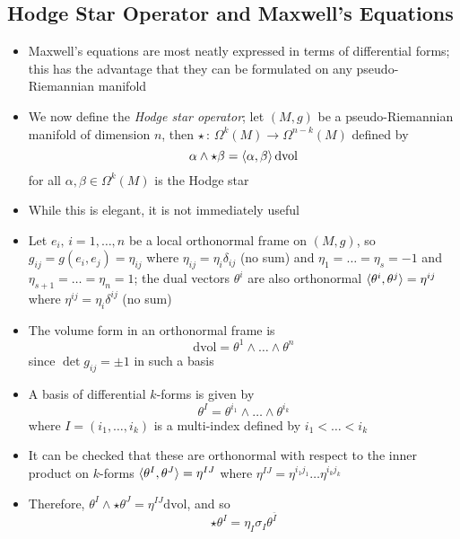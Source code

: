 \documentclass[12pt,a4paper]{article}
\numberwithin{equation}{section}
\begin{document}
	\subsection{Hodge Star Operator and Maxwell's Equations}
	\begin{itemize}
		\item Maxwell's equations are most neatly expressed in terms of differential forms; this has the advantage that they can be formulated on any pseudo-Riemannian manifold
		\item We now define the \textit{Hodge star operator}; let $(M,g)$ be a pseudo-Riemannian manifold of dimension $n$, then $\star\,:\,\Omega^{k}(M)\to\Omega^{n-k}(M)$ defined by
		\begin{equation}
			\alpha\wedge\star\beta=\braket{\alpha,\beta}\text{dvol}
		\end{equation}
		for all $\alpha,\beta\in\Omega^{k}(M)$ is the Hodge star
		\item While this is elegant, it is not immediately useful
		\item Let $e_{i},\,i=1,\ldots,n$ be a local orthonormal frame on $(M,g)$, so $g_{ij}=g(e_{i},e_{j})=\eta_{ij}$ where $\eta_{ij}=\eta_{i}\delta_{ij}$ (no sum) and $\eta_{1}=\ldots=\eta_{s}=-1$ and $\eta_{s+1}=\ldots=\eta_{n}=1$; the dual vectors $\theta^{i}$ are also orthonormal $\braket{\theta^{i},\theta^{j}}=\eta^{ij}$ where $\eta^{ij}=\eta_{i}\delta^{ij}$ (no sum)
		\item The volume form in an orthonormal frame is
		\begin{equation}
			\text{dvol}=\theta^{1}\wedge\ldots\wedge\theta^{n}
		\end{equation}
		since $\det{g_{ij}}=\pm1$ in such a basis
		\item A basis of differential $k$-forms is given by
		\begin{equation}
			\theta^{I}=\theta^{i_{1}}\wedge\ldots\wedge\theta^{i_{k}}
		\end{equation}
		where $I=(i_{1},\ldots,i_{k})$ is a multi-index defined by $i_{1}<\ldots<i_{k}$
		\item It can be checked that these are orthonormal with respect to the inner product on $k$-forms $\braket{\theta^{I},\theta^{J}}=\eta^{IJ}$ where $\eta^{IJ}=\eta^{i_{1}j_{1}}\ldots\eta^{i_{k}j_{k}}$
		\item Therefore, $\theta^{I}\wedge\star\theta^{J}=\eta^{IJ}\text{dvol}$, and so
		\begin{equation}
			\star\theta^{I}=\eta_{I}\sigma_{I}\theta^{\bar{I}}
		\end{equation}

\end{itemize}
\end{document}

